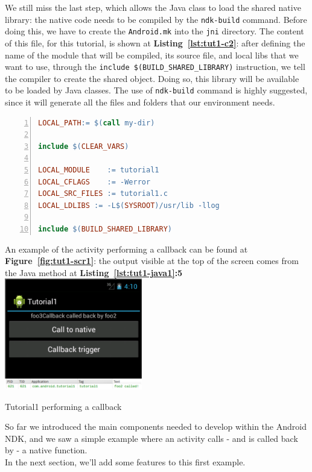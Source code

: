 \documentclass[a4paper,10pt]{article}
\makeatletter
\newenvironment{figurehere}{\def\@captype{figure}\vspace{2ex}}{\vspace{2ex}}
\newcommand{\keyword}[1]{\texttt{#1}}
\newcommand{\reff}[1]{\textbf{Figure~\ref{#1}}}
\newcommand{\refl}[1]{\textbf{Listing~\ref{#1}}}
\makeatother
\begin{document}
\begin{multicols}{2}
We still miss the last step, which allows the Java class to load the shared
native library: the native code needs to be compiled by the \keyword{ndk-build}
command. Before doing this, we have to create the \keyword{Android.mk} into the
\keyword{jni} directory. The content of this file, for this tutorial, is shown
at \refl{lst:tut1-c2}: after defining the name of the module that will be
compiled, its source file, and local libs that we want to use, through the
\keyword{include \$(BUILD\_SHARED\_LIBRARY)} instruction, we tell the compiler
to create the shared object. Doing so, this library will be available to be
loaded by Java classes. The use of \keyword{ndk-build} command is highly
suggested, since it will generate all the files and folders that our environment
needs.

\begin{lstlisting}[language=make,
		   columns=fullflexible,
		   showstringspaces=false,
		   xleftmargin=15pt,
		   frame = l,
		   numbers=left,
		   commentstyle=\color{gray}\upshape,
		   caption=Android.mk for tutorial1.c,
		   label=lst:tut1-c2]
LOCAL_PATH:= $(call my-dir)

include $(CLEAR_VARS)

LOCAL_MODULE    := tutorial1
LOCAL_CFLAGS    := -Werror
LOCAL_SRC_FILES := tutorial1.c
LOCAL_LDLIBS := -L$(SYSROOT)/usr/lib -llog

include $(BUILD_SHARED_LIBRARY)
\end{lstlisting}
An example of the activity performing a callback can be found at
\reff{fig:tut1-scr1}: the output visible at the top of the screen comes from the
Java method at \refl{lst:tut1-java1}\textbf{:5}\\

\begin{figurehere}
 \centering
 \includegraphics[width=6cm]{./figures/tut1-scr1.png}
 \caption{Tutorial1 performing a callback}
 \label{fig:tut1-scr1}
\end{figurehere}

So far we introduced the main components needed to develop within the Android
NDK, and we saw a simple example where an activity calls - and is called back
by - a native function.\\
In the next section, we'll add some features to this first example.


\end{multicols}
\end{document}
